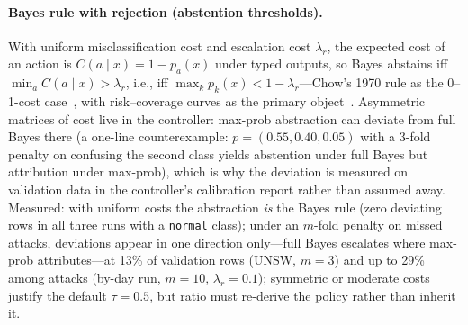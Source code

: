 \documentclass[sigconf,anonymous=false]{acmart}
\begin{document}
\paragraph{Bayes rule with rejection (abstention thresholds).} With uniform misclassification cost and escalation cost $\lambda_r$, the expected cost of an action is $C(a\mid x) = 1 - p_a(x)$ under typed outputs, so Bayes abstains iff $\min_a C(a\mid x) > \lambda_r$, i.e., iff $\max_k p_k(x) < 1-\lambda_r$---Chow's 1970 rule as the 0--1-cost case~\cite{chow1970, cortes2016rejection}, with risk--coverage curves as the primary object~\cite{elyaniv2010, geifman2017}. Asymmetric matrices of cost live in the controller: max-prob abstraction can deviate from full Bayes there (a one-line counterexample: $p = (0.55, 0.40, 0.05)$ with a 3-fold penalty on confusing the second class yields abstention under full Bayes but attribution under max-prob), which is why the deviation is measured on validation data in the controller's calibration report rather than assumed away. Measured: with uniform costs the abstraction \emph{is} the Bayes rule (zero deviating rows in all three runs with a \texttt{normal} class); under an $m$-fold penalty on missed attacks, deviations appear in one direction only---full Bayes escalates where max-prob attributes---at 13\% of validation rows (UNSW, $m{=}3$) and up to 29\% among attacks (by-day run, $m{=}10$, $\lambda_r{=}0.1$); symmetric or moderate costs justify the default $\tau{=}0.5$, but ratio must re-derive the policy rather than inherit it.
\end{document}

